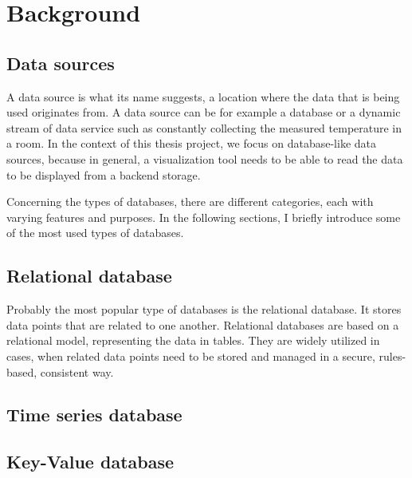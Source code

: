 \chapter{Background}

\section{Data sources}


A data source is what its name suggests, a location where the data that is being used originates from. A data source can be for example a database or a dynamic stream of data service such as constantly collecting the measured temperature in a room. In the context of this thesis project, we focus on database-like data sources, because in general, a visualization tool needs to be able to read the data to be displayed from a backend storage.

Concerning the types of databases, there are different categories, each with varying features and purposes. In the following sections, I briefly introduce some of the most used types of databases.

\section{Relational database}

Probably the most popular type of databases is the relational database. It stores data points that are related to one another. Relational databases are based on a relational model, representing the data in tables. They are widely utilized in cases, when related data points need to be stored and managed in a secure, rules-based, consistent way.

\section{Time series database}


\section{Key-Value database}


